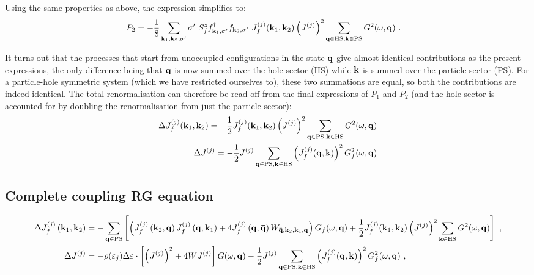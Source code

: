 \documentclass[%
reprint,
superscriptaddress,
groupedaddress,
superscriptaddress,
onecolumn,
]{revtex4-2}
\begin{document}
Using the same properties as above, the expression simplifies to:
\begin{equation}\begin{aligned}
	P_2 &= -\frac{1}{8}\sum_{{\bf k}_1, {\bf k}_2,\sigma^\prime} \sigma^\prime~S_f^z f^\dagger_{{\bf k}_1,\sigma^\prime}f_{{\bf k}_2,\sigma^\prime} ~  J_f^{(j)}({\bf k}_1,{\bf k}_2) \left(J^{(j)}\right)^2 \sum_{{\bf q} \in \text{HS} ,{\bf k} \in \text{PS}}G^2(\omega, {\bf q})~.
\end{aligned}\end{equation}

It turns out that the processes that start from unoccupied configurations in the state \({\bf q}\) give almost identical contributions as the present expressions, the only difference being that \({\bf q}\) is now summed over the hole sector (HS) while \({\bf k}\) is summed over the particle sector (PS). For a particle-hole symmetric system (which we have restricted ourselves to), these two summations are equal, so both the contributions are indeed identical. The total renormalisation can therefore be read off from the final expressions of \(P_1\) and \(P_2\) (and the hole sector is accounted for by doubling the renormalisation from just the particle sector):
\begin{equation}\begin{aligned}
	\Delta J_f^{(j)}({\bf k}_1,{\bf k}_2) = -\frac{1}{2}J_f^{(j)}({\bf k}_1,{\bf k}_2) \left(J^{(j)}\right)^2 \sum_{{\bf q} \in \text{PS} ,{\bf k} \in \text{HS}}G^2(\omega, {\bf q})\\
	\Delta J^{(j)} = -\frac{1}{2}J^{(j)} \sum_{{\bf q} \in \text{PS} ,{\bf k} \in \text{HS}}\left(J_f^{(j)}({\bf q},{\bf k})\right)^2G^2_f(\omega, {\bf q})\\
\end{aligned}\end{equation}

\subsection{Complete coupling RG equation}
\begin{equation}\begin{aligned}\label{rgEquation}
	\Delta J_f^{(j)}\left({\bf k}_1, {\bf k}_2\right) &= -\sum_{{\bf q} \in \text{PS}} \left[\left(J_f^{(j)}\left({\bf k}_2,{\bf q}\right) J_f^{(j)}\left({\bf q},{\bf k}_1\right) + 4J_f^{(j)}\left({\bf q}, {\bf \bar q}\right) W_{{\bf \bar q}, {\bf k}_2, {\bf k}_1, {\bf q}}\right) G_f(\omega, {\bf q}) + \frac{1}{2}J_f^{(j)}({\bf k}_1,{\bf k}_2) \left(J^{(j)}\right)^2 \sum_{{\bf k} \in \text{HS}}G^2(\omega, {\bf q})\right]~,\\
	\Delta J^{(j)} &= - \rho(\varepsilon_j)\Delta \varepsilon\cdot\left[\left(J^{(j)}\right)^2 + 4WJ^{(j)}\right] G(\omega, {\bf q}) -\frac{1}{2}J^{(j)} \sum_{{\bf q} \in \text{PS} ,{\bf k} \in \text{HS}}\left(J_f^{(j)}({\bf q},{\bf k})\right)^2G^2_f(\omega, {\bf q})~,
\end{aligned}\end{equation}
\end{document}
